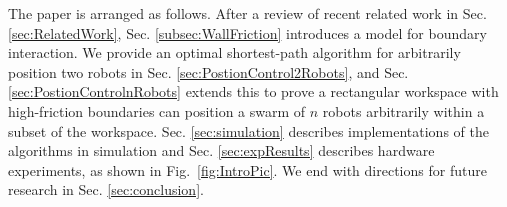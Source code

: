 The paper is arranged as follows. 
After a review of recent related work in Sec.  \ref{sec:RelatedWork},
  Sec.  \ref{subsec:WallFriction} introduces a  model for boundary interaction.  
We provide an optimal shortest-path algorithm for  arbitrarily position two robots in Sec.  \ref{sec:PostionControl2Robots}, and Sec.  \ref{sec:PostionControlnRobots} extends this to prove a rectangular workspace with high-friction boundaries can position a swarm of $n$ robots arbitrarily within a subset of the workspace.
Sec.  \ref{sec:simulation} describes implementations of the algorithms in simulation and  Sec.  \ref{sec:expResults} describes hardware experiments, as shown in Fig.~\ref{fig:IntroPic}. 
 We end with directions for future research in Sec.  \ref{sec:conclusion}.




